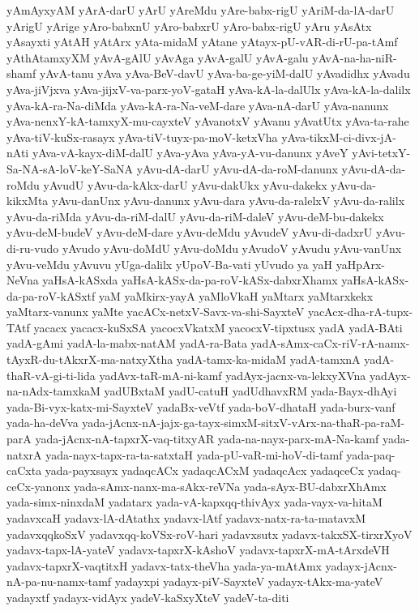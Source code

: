 {yAmAyxyAM
yArA-darU
yArU
yAreMdu
yAre-babx-rigU
yAriM-da-lA-darU
yArigU
yArige
yAro-babxnU
yAro-babxrU
yAro-babx-rigU
yAru
yAsAtx
yAsayxti
yAtAH
yAtArx
yAta-midaM
yAtane
yAtayx-pU-vAR-di-rU-pa-tAmf
yAthAtamxyXM
yAvA-gAlU
yAvAga
yAvA-galU
yAvA-galu
yAvA-na-ha-niR-shamf
yAvA-tanu
yAva
yAva-BeV-davU
yAva-ba-ge-yiM-dalU
yAvadidhx
yAvadu
yAva-jiVjxva
yAva-jijxV-va-parx-yoV-gataH
yAva-kA-la-dalUlx
yAva-kA-la-dalilx
yAva-kA-ra-Na-diMda
yAva-kA-ra-Na-veM-dare
yAva-nA-darU
yAva-nanunx
yAva-nenxY-kA-tamxyX-mu-cayxteV
yAvanotxV
yAvanu
yAvatUtx
yAva-ta-rahe
yAva-tiV-kuSx-rasayx
yAva-tiV-tuyx-pa-moV-ketxVha
yAva-tikxM-ci-divx-jA-nAti
yAva-vA-kayx-diM-dalU
yAva-yAva
yAva-yA-vu-danunx
yAveY
yAvi-tetxY-Sa-NA-sA-loV-keY-SaNA
yAvu-dA-darU
yAvu-dA-da-roM-danunx
yAvu-dA-da-roMdu
yAvudU
yAvu-da-kAkx-darU
yAvu-dakUkx
yAvu-dakekx
yAvu-da-kikxMta
yAvu-danUnx
yAvu-danunx
yAvu-dara
yAvu-da-ralelxV
yAvu-da-ralilx
yAvu-da-riMda
yAvu-da-riM-dalU
yAvu-da-riM-daleV
yAvu-deM-bu-dakekx
yAvu-deM-budeV
yAvu-deM-dare
yAvu-deMdu
yAvudeV
yAvu-di-dadxrU
yAvu-di-ru-vudo
yAvudo
yAvu-doMdU
yAvu-doMdu
yAvudoV
yAvudu
yAvu-vanUnx
yAvu-veMdu
yAvuvu
yUga-dalilx
yUpoV-Ba-vati
yUvudo
ya
yaH
yaHpArx-NeVna
yaHsA-kASxda
yaHsA-kASx-da-pa-roV-kASx-dabxrXhamx
yaHsA-kASx-da-pa-roV-kASxtf
yaM
yaMkirx-yayA
yaMloVkaH
yaMtarx
yaMtarxkekx
yaMtarx-vanunx
yaMte
yacACx-netxV-Savx-va-shi-SayxteV
yacAcx-dha-rA-tupx-TAtf
yacacx
yacacx-kuSxSA
yacocxVkatxM
yacocxV-tipxtusx
yadA
yadA-BAti
yadA-gAmi
yadA-la-mabx-natAM
yadA-ra-Bata
yadA-sAmx-caCx-riV-rA-namx-tAyxR-du-tAkxrX-ma-natxyXtha
yadA-tamx-ka-midaM
yadA-tamxnA
yadA-thaR-vA-gi-ti-lida
yadAvx-taR-mA-ni-kamf
yadAyx-jacnx-va-lekxyXVna
yadAyx-na-nAdx-tamxkaM
yadUBxtaM
yadU-catuH
yadUdhavxRM
yada-Bayx-dhAyi
yada-Bi-vyx-katx-mi-SayxteV
yadaBx-veVtf
yada-boV-dhataH
yada-burx-vanf
yada-ha-deVva
yada-jAcnx-nA-jajx-ga-tayx-simxM-sitxV-vArx-na-thaR-pa-raM-parA
yada-jAcnx-nA-tapxrX-vaq-titxyAR
yada-na-nayx-parx-mA-Na-kamf
yada-natxrA
yada-nayx-tapx-ra-ta-satxtaH
yada-pU-vaR-mi-hoV-di-tamf
yada-paq-caCxta
yada-payxsayx
yadaqcACx
yadaqcACxM
yadaqcAcx
yadaqceCx
yadaq-ceCx-yanonx
yada-sAmx-nanx-ma-sAkx-reVNa
yada-sAyx-BU-dabxrXhAmx
yada-simx-ninxdaM
yadatarx
yada-vA-kapxqq-thivAyx
yada-vayx-va-hitaM
yadavxcaH
yadavx-lA-dAtathx
yadavx-lAtf
yadavx-natx-ra-ta-matavxM
yadavxqqkoSxV
yadavxqq-koVSx-roV-hari
yadavxsutx
yadavx-takxSX-tirxrXyoV
yadavx-tapx-lA-yateV
yadavx-tapxrX-kAshoV
yadavx-tapxrX-mA-tArxdeVH
yadavx-tapxrX-vaqtitxH
yadavx-tatx-theVha
yada-ya-mAtAmx
yadayx-jAcnx-nA-pa-nu-namx-tamf
yadayxpi
yadayx-piV-SayxteV
yadayx-tAkx-ma-yateV
yadayxtf
yadayx-vidAyx
yadeV-kaSxyXteV
yadeV-ta-diti
}
